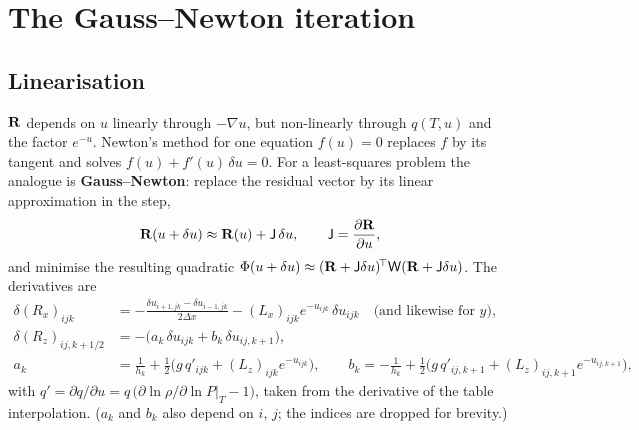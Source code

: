 \section{The Gauss--Newton iteration}\label{sec:gn}
\subsection{Linearisation}
$\mathbf R$ depends on $u$ linearly through $-\nabla u$, but non-linearly through $q(T,u)$ and the factor $e^{-u}$. Newton's method
for one equation $f(u)=0$ replaces $f$ by its tangent and solves $f(u)+f'(u)\,\delta u=0$. For a least-squares problem the
analogue is \textbf{Gauss--Newton}: replace the residual vector by its linear approximation in the step,
\begin{equation}
\mathbf R(u+\delta u)\approx\mathbf R(u)+\mathsf J\,\delta u ,\qquad \mathsf J=\frac{\partial\mathbf R}{\partial u},
\end{equation}
and minimise the resulting quadratic $\Phi(u+\delta u)\approx(\mathbf R+\mathsf J\delta u)^{\!\top}\mathsf W(\mathbf R+\mathsf J\delta u)$.
The derivatives are
\begin{align}
\delta(R_x)_{ijk}&=-\frac{\delta u_{i+1,jk}-\delta u_{i-1,jk}}{2\Delta x}-(L_x)_{ijk}e^{-u_{ijk}}\,\delta u_{ijk}
\quad\text{(and likewise for $y$)},\\
\delta(R_z)_{ij,k+1/2}&=-\big(a_k\,\delta u_{ijk}+b_k\,\delta u_{ij,k+1}\big),\\
a_k&=\frac1{h_k}+\frac12\Big(g\,q'_{ijk}+(L_z)_{ijk}e^{-u_{ijk}}\Big),\qquad
b_k=-\frac1{h_k}+\frac12\Big(g\,q'_{ij,k+1}+(L_z)_{ij,k+1}e^{-u_{ij,k+1}}\Big),
\end{align}
with $q'=\partial q/\partial u=q\,\big(\partial\ln\rho/\partial\ln P|_T-1\big)$, taken from the derivative of the table
interpolation. ($a_k$ and $b_k$ also depend on $i$, $j$; the indices are dropped for brevity.)

